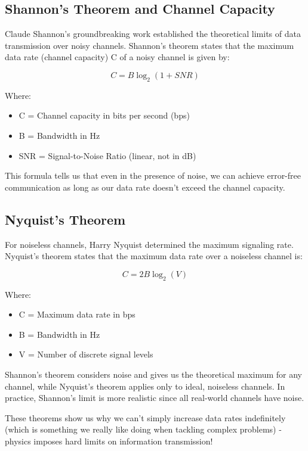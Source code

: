 \subsection*{Shannon's Theorem and Channel Capacity}
Claude Shannon's groundbreaking work established the theoretical limits of data transmission over noisy channels. Shannon's theorem states that the maximum data rate (channel capacity) C of a noisy channel is given by:

\begin{equation}
C = B \log_2(1 + SNR)
\end{equation}

Where:
\begin{itemize}
    \item C = Channel capacity in bits per second (bps)
    \item B = Bandwidth in Hz
    \item SNR = Signal-to-Noise Ratio (linear, not in dB)
\end{itemize}

This formula tells us that even in the presence of noise, we can achieve error-free communication as long as our data rate doesn't exceed the channel capacity.

\subsection*{Nyquist's Theorem}
For noiseless channels, Harry Nyquist determined the maximum signaling rate. Nyquist's theorem states that the maximum data rate over a noiseless channel is:

\begin{equation}
C = 2B \log_2(V)
\end{equation}

Where:
\begin{itemize}
    \item C = Maximum data rate in bps
    \item B = Bandwidth in Hz
    \item V = Number of discrete signal levels
\end{itemize}

\begin{importantblock}
    Shannon's theorem considers noise and gives us the theoretical maximum for any channel, while Nyquist's theorem applies only to ideal, noiseless channels. In practice, Shannon's limit is more realistic since all real-world channels have noise.
\end{importantblock}

These theorems show us why we can't simply increase data rates indefinitely (which is something we really like doing when tackling complex problems) - physics imposes hard limits on information transmission!
